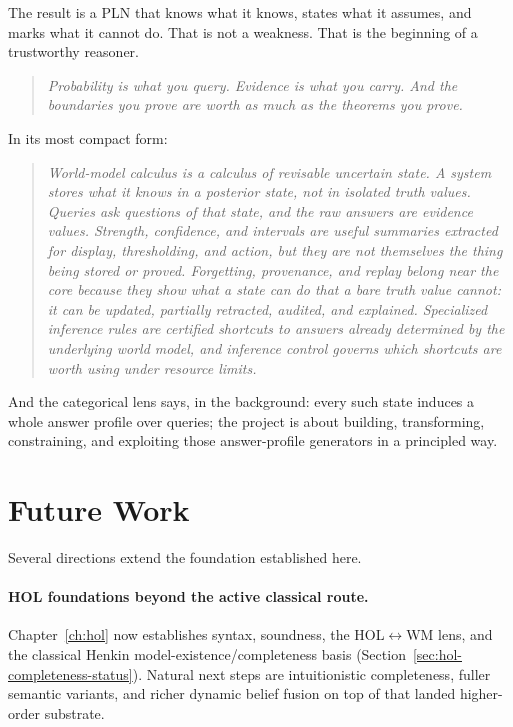 \documentclass[11pt,openany]{report}
\begin{document}
The result is a PLN that knows what it knows, states what it assumes,
and marks what it cannot do.  That is not a weakness.  That is the
beginning of a trustworthy reasoner.

\begin{quote}
\emph{Probability is what you query.  Evidence is what you carry.
  And the boundaries you prove are worth as much as the theorems you prove.}
\end{quote}

\noindent
In its most compact form:

\begin{quote}
\emph{World-model calculus is a calculus of revisable uncertain state.
A system stores what it knows in a posterior state, not in isolated
truth values.  Queries ask questions of that state, and the raw answers
are evidence values.  Strength, confidence, and intervals are useful
summaries extracted for display, thresholding, and action, but they are
not themselves the thing being stored or proved.  Forgetting,
provenance, and replay belong near the core because they show what a
state can do that a bare truth value cannot: it can be updated,
partially retracted, audited, and explained.  Specialized inference
rules are certified shortcuts to answers already determined by the
underlying world model, and inference control governs which shortcuts
are worth using under resource limits.}
\end{quote}

\noindent
And the categorical lens says, in the background: every such state
induces a whole answer profile over queries; the project is about
building, transforming, constraining, and exploiting those
answer-profile generators in a principled way.

\section*{Future Work}

Several directions extend the foundation established here.

\paragraph{HOL foundations beyond the active classical route.}
Chapter~\ref{ch:hol} now establishes syntax, soundness, the HOL$\leftrightarrow$WM
lens, and the classical Henkin model-existence/completeness basis
(Section~\ref{sec:hol-completeness-status}).  Natural next steps are
intuitionistic completeness, fuller semantic variants, and richer dynamic
belief fusion on top of that landed higher-order substrate.
\end{document}
